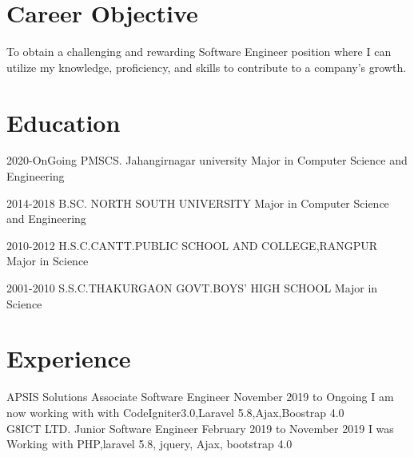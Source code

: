 \documentclass[]{cv-style}
\begin{document}
\section{Career Objective}
To obtain a challenging and rewarding Software Engineer position where I can utilize my knowledge, proficiency, and skills to contribute to a company's growth.
\section{Education}
\begin{entrylist}
  \entry
    {2020-OnGoing \enspace}
    {PMSCS. Jahangirnagar university}
    {Major in Computer Science and Engineering}

  \entry
    {2014-2018} 
    {B.SC. NORTH SOUTH UNIVERSITY}
    {Major in Computer Science and Engineering}
    
  \entry
    {2010-2012}
    {H.S.C.CANTT.PUBLIC SCHOOL AND COLLEGE,RANGPUR}
    {Major in Science}
    
  \entry
    {2001-2010}
    {S.S.C.THAKURGAON GOVT.BOYS' HIGH SCHOOL}
    {Major in Science}
    
 
\end{entrylist}
\section{Experience}
\begin{entrylist}
 \entry
  {APSIS Solutions \enspace}
   {Associate Software Engineer}
  {November 2019 to Ongoing}
    {I am now working with with CodeIgniter3.0,Laravel 5.8,Ajax,Boostrap 4.0}
    \\
\entry
  {G8ICT LTD.}
  {Junior Software Engineer}
  {February 2019 to November 2019}
 { I was  Working with PHP,laravel 5.8, jquery, Ajax, bootstrap 4.0}

\end{entrylist}

\end{document}
